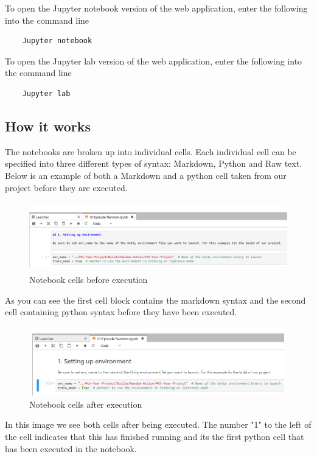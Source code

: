 To open the Jupyter notebook version of the web application, enter the following into the command line
\begin{verbatim}	
	Jupyter notebook 
\end{verbatim}
To open the Jupyter lab version of the web application, enter the following into the command line
\begin{verbatim}
	Jupyter lab 
\end{verbatim}

\subsection{How it works}
The notebooks are broken up into individual cells. Each individual cell can be specified into three different types of syntax: Markdown, Python and Raw text. Below is an example of both a Markdown and a python cell taken from our project before they are executed.

\begin{figure}[H]
    \centering
    \includegraphics[width=115mm, height=30mm]{img/Notebook1.PNG}
    \caption{Notebook cells before execution}
    \label{fig:sd4}
\end{figure}

\begin{flushleft}
As you can see the first cell block contains the markdown syntax and the second cell containing python syntax before they have been executed.
\end{flushleft}

\begin{figure}[H]
    \centering
    \includegraphics[width=115mm, height=30mm]{img/Notebook2.PNG}
    \caption{Notebook cells after execution}
    \label{fig:sd4}
\end{figure}

\begin{flushleft}
In this image we see both cells after being executed. The number "1" to the left of the cell indicates that this has finished running and its the first python cell that has been executed in the notebook. 
\end{flushleft}

